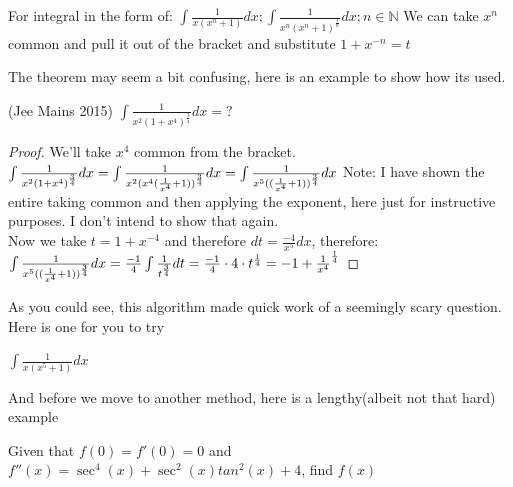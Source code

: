 \begin{theorem}
    For integral in the form of: $ \int \frac{1}{x(x^n+1)} dx; \int \frac{1}{x^n(x^n+1)^{\frac{1}{n}}} dx; n \in \mathbb{N}$
    We can take $x^n$ common and pull it out of the bracket and substitute $1+x^{-n}=t$
\end{theorem}
The theorem may seem a bit confusing, here is an example to show how its used.\\
\begin{example}
    (Jee Mains 2015) $\int \frac{1}{x^2(1+x^4)^{\frac{3}{4}}}dx=?$
\end{example}
\begin{proof}
    We'll take $x^4$ common from the bracket.\\
    $
    \int \frac{1}{x^2(1+x^4)^{\frac{3}{4}}}dx\\
    = \int \frac{1}{x^2(x^4(\frac{1}{x^4}+1))^{\frac{3}{4}}}dx\\
    = \int \frac{1}{x^5((\frac{1}{x^4}+1))^{\frac{3}{4}}}dx\\
    $
    Note: I have shown the entire taking common and then applying the exponent, here just for instructive purposes. I don't intend to show that again.\\
    Now we take $t=1+x^{-4}$ and therefore $dt=\frac{-4}{x^5}dx$, therefore:\\
    $
    \int \frac{1}{x^5((\frac{1}{x^4}+1))^{\frac{3}{4}}}dx\\
    = \frac{-1}{4}\int \frac{1}{t^{\frac{3}{4}}}dt\\
    = \frac{-1}{4} \cdot 4 \cdot {t^{\frac{1}{4}}}\\
    = -{1+\frac{1}{x^4}}^{\frac{1}{4}}\\
    $
\end{proof}
As you could see, this algorithm made quick work of a seemingly scary question.\\
Here is one for you to try\\
\begin{example}
    $\int \frac{1}{x(x^5+1)}dx$
\end{example}
And before we move to another method, here is a lengthy(albeit not that hard) example\\
\begin{example}
    Given that $f(0)=f'(0)=0$ and $f''(x)=\sec^4(x)+\sec^2(x)tan^2(x)+4$, find $f(x)$
\end{example}
